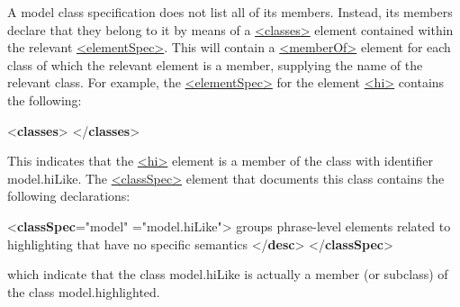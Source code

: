 A model class specification does not list all of its members. Instead, its members declare that they belong to it by means of a \hyperref[TEI.classes]{<classes>} element contained within the relevant \hyperref[TEI.elementSpec]{<elementSpec>}. This will contain a \hyperref[TEI.memberOf]{<memberOf>} element for each class of which the relevant element is a member, supplying the name of the relevant class. For example, the \hyperref[TEI.elementSpec]{<elementSpec>} for the element \hyperref[TEI.hi]{<hi>} contains the following: \par\bgroup{}\exampleFont \begin{shaded}\noindent\mbox{}{<\textbf{classes}>}\mbox{}\newline 
{}\mbox{}\newline 
{</\textbf{classes}>}\end{shaded}\egroup\par \noindent  This indicates that the \hyperref[TEI.hi]{<hi>} element is a member of the class with identifier \textsf{model.hiLike}. The \hyperref[TEI.classSpec]{<classSpec>} element that documents this class contains the following declarations: \par\bgroup{}\exampleFont \begin{shaded}\noindent\mbox{}{<\textbf{classSpec}\hspace*{1em}{type}="{model}"\mbox{}\newline 
\hspace*{1em}{ident}="{model.hiLike}">}\mbox{}\newline 
{}groups phrase-level elements related to highlighting that have no specific semantics {</\textbf{desc}>}\mbox{}\newline 
{}\mbox{}\newline 
\hspace*{1em}\mbox{}\newline 
{}\mbox{}\newline 
{</\textbf{classSpec}>}\end{shaded}\egroup\par \noindent  which indicate that the class \textsf{model.hiLike} is actually a member (or subclass) of the class \textsf{model.highlighted}.\par
